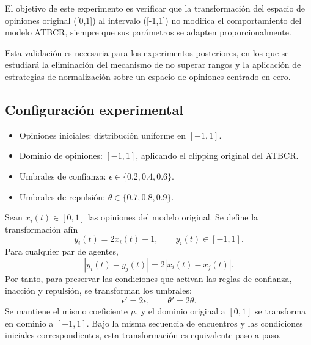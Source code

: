 \documentclass[11pt,a4paper]{article}
\begin{document}
El objetivo de este experimento es verificar que la transformación del espacio de opiniones original ([0,1]) al intervalo ([-1,1]) no modifica el comportamiento del modelo ATBCR, siempre que sus parámetros se adapten proporcionalmente.

Esta validación es necesaria para los experimentos posteriores, en los que se estudiará la eliminación del mecanismo de no superar rangos y la aplicación de estrategias de normalización sobre un espacio de opiniones centrado en cero.

\subsection{Configuración experimental}

\begin{itemize}
    \item Opiniones iniciales: distribución uniforme en $[-1,1]$.
    \item Dominio de opiniones: $[-1,1]$, aplicando el clipping original del ATBCR.
    \item Umbrales de confianza: $\epsilon\in\{0.2,0.4,0.6\}$.
    \item Umbrales de repulsión: $\theta\in\{0.7,0.8,0.9\}$.
\end{itemize}

Sean $x_i(t)\in[0,1]$ las opiniones del modelo original. Se define la transformación afín
\begin{equation}
 y_i(t)=2x_i(t)-1, \qquad y_i(t)\in[-1,1].
\end{equation}
Para cualquier par de agentes,
\begin{equation}
 |y_i(t)-y_j(t)|=2|x_i(t)-x_j(t)|.
\end{equation}
Por tanto, para preservar las condiciones que activan las reglas de confianza, inacción y repulsión, se transforman los umbrales:
\begin{equation}
 \epsilon'=2\epsilon,\qquad \theta'=2\theta.
\end{equation}
Se mantiene el mismo coeficiente $\mu$, y el dominio original a $[0,1]$ se transforma en dominio a $[-1,1]$. Bajo la misma secuencia de encuentros y las condiciones iniciales correspondientes, esta transformación es equivalente paso a paso.
\end{document}
